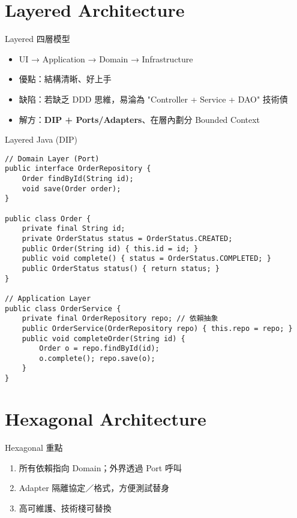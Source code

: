 \documentclass[UTF8]{beamer}
\begin{document}
\section{Layered Architecture}
\begin{frame}{Layered 四層模型}
    \begin{itemize}
        \item UI → Application → Domain → Infrastructure
        \item 優點：結構清晰、好上手
        \item 缺陷：若缺乏 DDD 思維，易淪為 "Controller + Service + DAO" 技術債
        \item 解方：\textbf{DIP + Ports/Adapters}、在層內劃分 Bounded Context
    \end{itemize}
\end{frame}

\begin{frame}[fragile]{Layered Java (DIP)}
    \tiny
    \begin{lstlisting}
// Domain Layer (Port)
public interface OrderRepository {
    Order findById(String id);
    void save(Order order);
}

public class Order {
    private final String id;
    private OrderStatus status = OrderStatus.CREATED;
    public Order(String id) { this.id = id; }
    public void complete() { status = OrderStatus.COMPLETED; }
    public OrderStatus status() { return status; }
}

// Application Layer
public class OrderService {
    private final OrderRepository repo; // 依賴抽象
    public OrderService(OrderRepository repo) { this.repo = repo; }
    public void completeOrder(String id) {
        Order o = repo.findById(id);
        o.complete(); repo.save(o);
    }
}
\end{lstlisting}
\end{frame}

\section{Hexagonal Architecture}
\begin{frame}{Hexagonal 重點}
    \begin{enumerate}
        \item 所有依賴指向 Domain；外界透過 Port 呼叫
        \item Adapter 隔離協定／格式，方便測試替身
        \item 高可維護、技術棧可替換
    \end{enumerate}
\end{frame}
\end{document}
